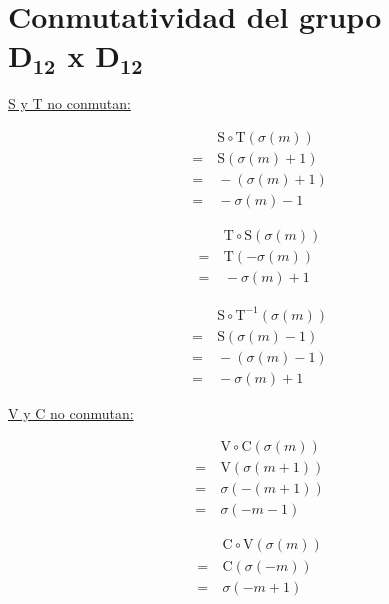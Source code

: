 	\section[Conmutatividad del grupo D$_{\textbf{12}}$ x D$_{\textbf{12}}$]{Conmutatividad del grupo \\D$_{\textbf{12}}$ x D$_{\textbf{12}}$}
	\label{app:commm}
	\begin{center}
		
		\underline{S y T no conmutan:}
		\vspace*{-\bigskipamount}
		\begin{multicols}{3}
			\begin{align*}
			&\ \text{S}\circ\text{T}(\sigma(m))\\
			=&\ \text{S}(\sigma(m)+1)\\
			=&\ -(\sigma(m)+1)\\
			=&\ -\sigma(m)-1
			\end{align*}
			
			\begin{align*}
			&\ \text{T}\circ\text{S}(\sigma(m))\\
			=&\ \text{T}(-\sigma(m))\\
			=&\ -\sigma(m)+1
			\end{align*}
			
			\begin{align*}
			&\ \text{S}\circ\text{T}^{-1}(\sigma(m))\\
			=&\ \text{S}(\sigma(m)-1)\\
			=&\ -(\sigma(m)-1)\\
			=&\ -\sigma(m)+1
			\end{align*}
		\end{multicols}
		
		\underline{V y C no conmutan:}
		\vspace*{-\bigskipamount}
		\begin{multicols}{3}
			\begin{align*}
			&\ \text{V}\circ\text{C}(\sigma(m))\\
			=&\ \text{V}(\sigma(m+1))\\
			=&\ \sigma(-(m+1))\\
			=&\ \sigma(-m-1)
			\end{align*}
			
			\begin{align*}
			&\ \text{C}\circ\text{V}(\sigma(m))\\
			=&\ \text{C}(\sigma(-m))\\
			=&\ \sigma(-m+1)
			\end{align*}
			

\end{multicols}
\end{center}
